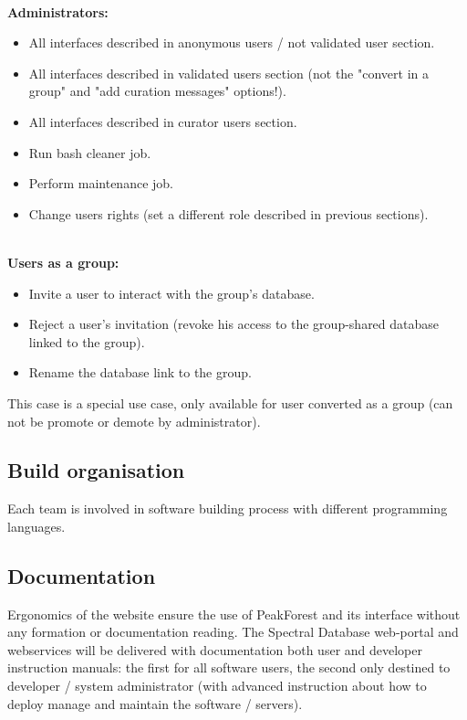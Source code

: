~\\
\textbf{Administrators:}
\begin{itemize}
	\item All interfaces described in anonymous users / not validated user section.
	\item All interfaces described in validated users section (not the "convert in a group" and "add curation messages" options!).
	\item All interfaces described in curator users section.
	\item Run bash cleaner job.
	\item Perform maintenance job.
	\item Change users rights (set a different role described in previous sections).
\end{itemize}
~\\
\textbf{Users as a group:}
\begin{itemize}
	\item Invite a user to interact with the group's database.
	\item Reject a user's invitation (revoke his access to the group-shared database linked to the group).
	\item Rename the database link to the group.
\end{itemize}

This case is a special use case, only available for user converted as a group (can not be promote or demote by administrator).


\subsection{Build organisation}

Each team is involved in software building process with different programming languages. 

\subsection{Documentation}
Ergonomics of the website ensure the use of PeakForest and its interface without any formation or documentation reading.
The Spectral Database web-portal and webservices will be delivered with documentation both user and developer instruction manuals: 
the first for all software users, the second only destined to developer / system administrator (with advanced instruction about how to deploy manage and maintain the software / servers).



